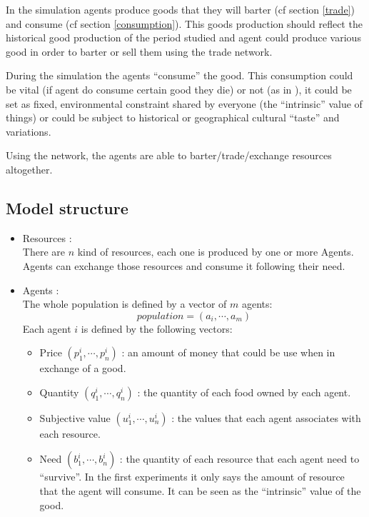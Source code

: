 \documentclass{wscpaperproc}
\begin{document}
In the simulation agents produce goods that they will barter (cf section \ref{trade}) and consume (cf section \ref{consumption}). This goods production should reflect the historical good production of the period studied and agent could produce various good in order to barter or sell them using the trade network.

During the simulation the agents ``consume'' the good. This consumption could be vital (if agent do consume certain good they die) or not (as in \cite{macmillan_agent-based_2008}), it could be set as fixed, environmental constraint shared by everyone (the ``intrinsic'' value of things) or could be subject to historical or geographical cultural ``taste'' and variations.

Using the network, the agents are able to barter/trade/exchange resources altogether. 



\subsection{Model structure} 
\begin{itemize}
	\item Resources :\\
		There are $n$ kind of resources, each one is produced by one or more Agents. Agents can exchange those resources and consume it following their need.
	\item  Agents :\\
		The whole population is defined by a vector of $m$ agents: 
		$$ population= (a_i, \cdots ,a_m) $$
		Each agent $i$ is defined by the following vectors:
		\begin{itemize}
			\item Price $(p^i_1,\cdots,p^i_n)$ : an amount of money that could be use when in exchange of a good.
			\item Quantity $(q^i_1,\cdots,q^i_n)$ : the quantity of each food owned by each agent.
			\item Subjective value $(u^i_1,\cdots,u^i_n)$ : the values that each agent associates with each resource.
			\item Need $(b^i_1, \cdots, b^i_n)$ :  the quantity of each resource that each agent need to ``survive''. In the first experiments it only says the amount of resource that the agent will consume. It can be seen as the ``intrinsic'' value of the good.
		\end{itemize}
\end{itemize}
\end{document}
